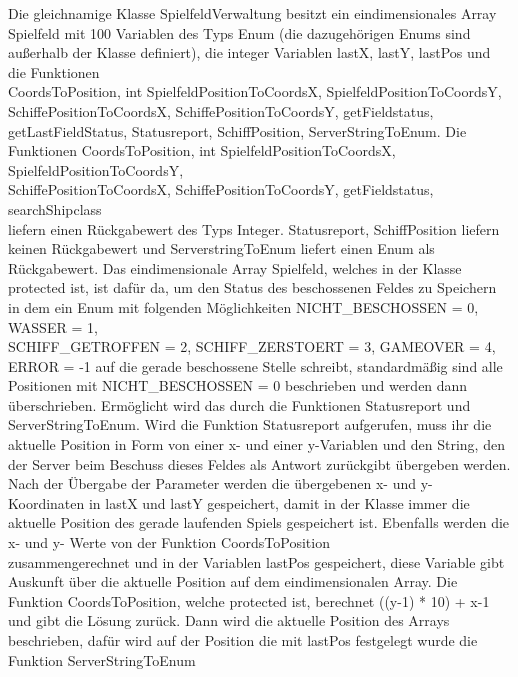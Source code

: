 Die gleichnamige Klasse SpielfeldVerwaltung besitzt ein eindimensionales Array \\Spielfeld mit 100 Variablen des Typs Enum
(die dazugehörigen Enums sind außerhalb der Klasse definiert), die integer Variablen lastX, lastY, lastPos und die Funktionen \\CoordsToPosition, int SpielfeldPositionToCoordsX, 
SpielfeldPositionToCoordsY, \\SchiffePositionToCoordsX, SchiffePositionToCoordsY, getFieldstatus, \\getLastFieldStatus, Statusreport, SchiffPosition, ServerStringToEnum.
Die Funktionen CoordsToPosition, int SpielfeldPositionToCoordsX, SpielfeldPositionToCoordsY, \\SchiffePositionToCoordsX, SchiffePositionToCoordsY, getFieldstatus, searchShipclass 
\\liefern einen Rückgabewert des Typs Integer. 
Statusreport, SchiffPosition liefern \\keinen Rückgabewert und ServerstringToEnum liefert einen Enum als Rückgabewert. 
Das eindimensionale Array Spielfeld, welches in der Klasse protected ist, ist dafür da, um den Status des beschossenen Feldes zu Speichern in dem ein Enum mit folgenden Möglichkeiten 
NICHT\_BESCHOSSEN = 0, WASSER = 1, \\SCHIFF\_GETROFFEN = 2, SCHIFF\_ZERSTOERT = 3, GAMEOVER = 4, \\ERROR = -1 auf die gerade beschossene Stelle schreibt, standardmäßig sind alle 
\\Positionen mit NICHT\_BESCHOSSEN = 0 beschrieben und werden dann überschrieben. Ermöglicht wird das durch die Funktionen Statusreport und ServerStringToEnum. Wird die Funktion 
Statusreport aufgerufen, muss ihr die aktuelle Position in Form von einer x- und einer y-Variablen und den String, den der Server beim Beschuss dieses Feldes als Antwort 
zurückgibt übergeben werden. Nach der Übergabe der Parameter werden die übergebenen x- und y- Koordinaten in lastX und lastY gespeichert, damit in der Klasse immer die aktuelle 
Position des gerade laufenden Spiels gespeichert ist. Ebenfalls werden die x- und y- Werte von der Funktion CoordsToPosition \\zusammengerechnet und in der Variablen lastPos 
gespeichert, diese Variable gibt Auskunft über die aktuelle Position auf dem eindimensionalen Array. Die Funktion CoordsToPosition, welche protected ist, berechnet ((y-1) * 10) + x-1 
und gibt die Lösung zurück. Dann wird die aktuelle Position des Arrays beschrieben, dafür wird auf der Position die mit lastPos festgelegt wurde die Funktion ServerStringToEnum 
